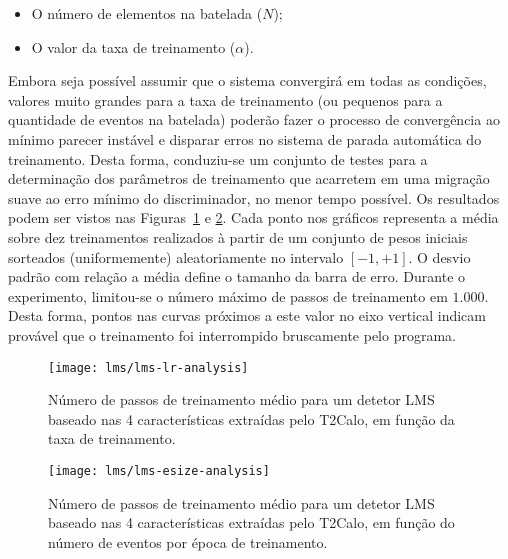 \begin{itemize}
\item O número de elementos na batelada ($N$);
\item O valor da taxa de treinamento ($\alpha$).
\end{itemize}

Embora seja possível assumir que o sistema convergirá em todas as condições,
valores muito grandes para a taxa de treinamento (ou pequenos para a
quantidade de eventos na batelada) poderão fazer o processo de convergência ao
mínimo parecer instável e disparar erros no sistema de parada automática do
treinamento. Desta forma, conduziu-se um conjunto de testes para a
determinação dos parâmetros de treinamento que acarretem em uma migração suave
ao erro mínimo do discriminador, no menor tempo possível. Os resultados podem
ser vistos nas Figuras~\ref{fig:lms-lr-analysis} e
\ref{fig:lms-esize-analysis}. Cada ponto nos gráficos representa a média sobre
dez treinamentos realizados à partir de um conjunto de pesos iniciais
sorteados (uniformemente) aleatoriamente no intervalo $[-1, +1]$. O desvio
padrão com relação a média define o tamanho da barra de erro. Durante o
experimento, limitou-se o número máximo de passos de treinamento em
$1.000$. Desta forma, pontos nas curvas próximos a este valor no eixo vertical
indicam provável que o treinamento foi interrompido bruscamente pelo programa.

\begin{figure}
\begin{center}
\texttt{[image: lms/lms-lr-analysis]}
\end{center}
\caption{Número de passos de treinamento médio para um detetor LMS baseado nas
4 características extraídas pelo T2Calo, em função da taxa de treinamento.}
\label{fig:lms-lr-analysis}
\end{figure}

\begin{figure}
\begin{center}
\texttt{[image: lms/lms-esize-analysis]}
\end{center}
\caption{Número de passos de treinamento médio para um detetor LMS baseado nas
4 características extraídas pelo T2Calo, em função do número de eventos por
época de treinamento.}
\label{fig:lms-esize-analysis}
\end{figure}

